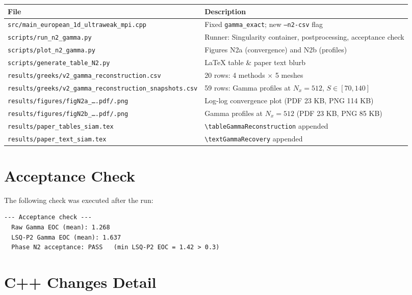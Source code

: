 \documentclass[11pt,a4paper]{article}
\newcommand{\Nx}{N_x}
\begin{document}
\begin{center}
\begin{tabular}{ll}
\toprule
File & Description \\
\midrule
\texttt{src/main\_european\_1d\_ultraweak\_mpi.cpp} &
  Fixed \texttt{gamma\_exact}; new \texttt{--n2-csv} flag \\
\texttt{scripts/run\_n2\_gamma.py} &
  Runner: Singularity container, postprocessing, acceptance check \\
\texttt{scripts/plot\_n2\_gamma.py} &
  Figures N2a (convergence) and N2b (profiles) \\
\texttt{scripts/generate\_table\_N2.py} &
  LaTeX table \& paper text blurb \\
\texttt{results/greeks/v2\_gamma\_reconstruction.csv} &
  20 rows: 4 methods $\times$ 5 meshes \\
\texttt{results/greeks/v2\_gamma\_reconstruction\_snapshots.csv} &
  59 rows: Gamma profiles at $\Nx=512$, $S\in[70,140]$ \\
\texttt{results/figures/figN2a\_\ldots.pdf/.png} &
  Log-log convergence plot (PDF 23 KB, PNG 114 KB) \\
\texttt{results/figures/figN2b\_\ldots.pdf/.png} &
  Gamma profiles at $\Nx=512$ (PDF 23 KB, PNG 85 KB) \\
\texttt{results/paper\_tables\_siam.tex} &
  \texttt{\textbackslash tableGammaReconstruction} appended \\
\texttt{results/paper\_text\_siam.tex} &
  \texttt{\textbackslash textGammaRecovery} appended \\
\bottomrule
\end{tabular}
\end{center}

\appendix
\section{Acceptance Check}
\label{app:acceptance}

The following check was executed after the run:
\begin{verbatim}
--- Acceptance check ---
  Raw Gamma EOC (mean): 1.268
  LSQ-P2 Gamma EOC (mean): 1.637
  Phase N2 acceptance: PASS   (min LSQ-P2 EOC = 1.42 > 0.3)
\end{verbatim}

\section{C++ Changes Detail}
\label{app:cpp}
\end{document}
